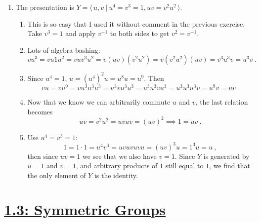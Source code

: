 \documentclass[]{article}
\begin{document}
\begin{enumerate}
\item The presentation is $Y = \langle\, u,v \ \vert\ u^4=v^3=1, uv=v^2u^2\, \rangle$.
\begin{enumerate}
\item This is so easy that I used it without comment in the previous exercise. Take $v^3 = 1$ and apply $v^{-1}$ to both sides to get $v^2 = v^{-1}$.
\item Lots of algebra bashing:
\begin{equation}
vu^3 = vu1u^2 = vuv^3u^2 = v(uv)(v^2u^2) = v(v^2u^2)(uv) = v^3u^3v = u^3v\ .
\end{equation}
\item Since $u^4 = 1$, $u = (u^4)^2u = u^8u = u^9$. Then
\begin{equation}
vu = vu^9 = vu^3u^3u^3 = u^3vu^3u^3 = u^3u^3vu^3 = u^3u^3u^3v = u^9v = uv\ .
\end{equation}
\item Now that we know we can arbitrarily commute $u$ and $v$, the last relation becomes
\begin{equation}
uv = v^2u^2 = uvuv = (uv)^2 \implies 1 = uv\ .
\end{equation}
\item Use $u^4 = v^3 = 1$:
\begin{equation}
1 = 1\cdot 1 = u^4v^3 = uvuvuvu = (uv)^3u = 1^3u = u\ ,
\end{equation}
then since $uv = 1$ we see that we also have $v = 1$. Since $Y$ is generated by $u=1$ and $v=1$, and arbitrary products of $1$ still equal to $1$, we find that the only element of $Y$ is the identity.
\end{enumerate}


\end{enumerate}
























\section*{\underline{1.3: Symmetric Groups}}
\end{document}
